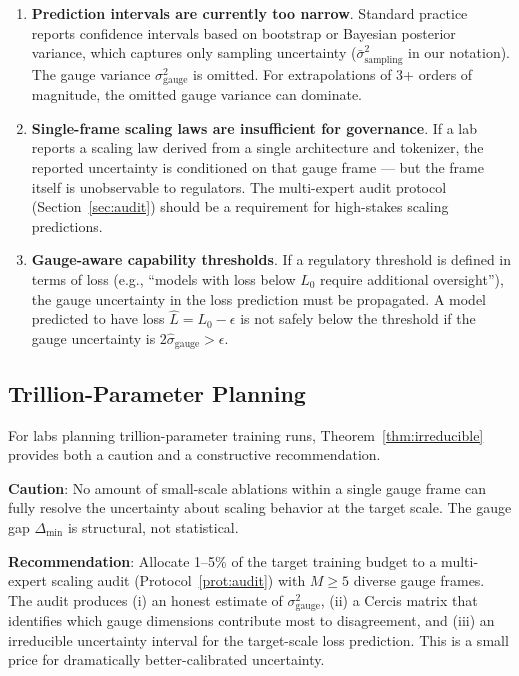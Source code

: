 \documentclass[12pt,a4paper]{article}
\theoremstyle{remark}
\newcommand{\Loss}{L}
\begin{document}
\begin{enumerate}[label=(\arabic*), leftmargin=*]
    \item \textbf{Prediction intervals are currently too narrow}. Standard practice reports confidence intervals based on bootstrap or Bayesian posterior variance, which captures only sampling uncertainty ($\bar{\sigma}^2_{\text{sampling}}$ in our notation). The gauge variance $\sigma^2_{\text{gauge}}$ is omitted. For extrapolations of 3+ orders of magnitude, the omitted gauge variance can dominate.
    \item \textbf{Single-frame scaling laws are insufficient for governance}. If a lab reports a scaling law derived from a single architecture and tokenizer, the reported uncertainty is conditioned on that gauge frame — but the frame itself is unobservable to regulators. The multi-expert audit protocol (Section~\ref{sec:audit}) should be a requirement for high-stakes scaling predictions.
    \item \textbf{Gauge-aware capability thresholds}. If a regulatory threshold is defined in terms of loss (e.g., ``models with loss below $\Loss_0$ require additional oversight''), the gauge uncertainty in the loss prediction must be propagated. A model predicted to have loss $\hat{\Loss} = \Loss_0 - \epsilon$ is not safely below the threshold if the gauge uncertainty is $2\hat{\sigma}_{\text{gauge}} > \epsilon$.
\end{enumerate}

\subsection{Trillion-Parameter Planning}

For labs planning trillion-parameter training runs, Theorem~\ref{thm:irreducible} provides both a caution and a constructive recommendation.

\textbf{Caution}: No amount of small-scale ablations within a single gauge frame can fully resolve the uncertainty about scaling behavior at the target scale. The gauge gap $\Delta_{\min}$ is structural, not statistical.

\textbf{Recommendation}: Allocate 1--5\% of the target training budget to a multi-expert scaling audit (Protocol~\ref{prot:audit}) with $M \geq 5$ diverse gauge frames. The audit produces (i) an honest estimate of $\sigma^2_{\text{gauge}}$, (ii) a Cercis matrix that identifies which gauge dimensions contribute most to disagreement, and (iii) an irreducible uncertainty interval for the target-scale loss prediction. This is a small price for dramatically better-calibrated uncertainty.
\end{document}
